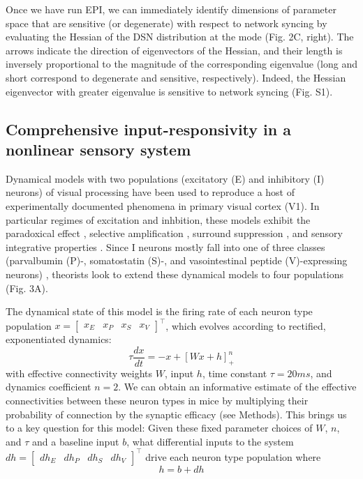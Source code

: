 \documentclass[11pt]{article}
\begin{document}
Once we have run EPI, we can immediately identify dimensions of parameter space that are sensitive (or degenerate) with respect to network syncing by evaluating the Hessian of the DSN distribution at the mode (Fig. 2C, right).  The arrows indicate the direction of eigenvectors of the Hessian, and their length is inversely proportional to the magnitude of the corresponding eigenvalue (long and short correspond to degenerate and sensitive, respectively).  Indeed, the Hessian eigenvector with greater eigenvalue is sensitive to network syncing (Fig. S1). 

\subsection{Comprehensive input-responsivity in a nonlinear sensory system}
Dynamical models with two populations (excitatory (E) and inhibitory (I) neurons) of visual processing have been used to reproduce a host of experimentally documented phenomena in primary visual cortex (V1).  In particular regimes of excitation and inhbition, these models exhibit the paradoxical effect \cite{tsodyks1997paradoxical}, selective amplification \cite{murphy2009balanced}, surround suppression \cite{ozeki2009inhibitory}, and  sensory integrative properties \cite{rubin2015stabilized}.  Since I neurons mostly fall into one of three classes (parvalbumin (P)-, somatostatin (S)-, and vasointestinal peptide (V)-expressing neurons) \cite{markram2004interneurons, rudy2011three}, theorists look to extend these dynamical models to four populations \cite{litwin2016inhibitory} (Fig. 3A).

The dynamical state of this model is the firing rate of each neuron type population $x = \begin{bmatrix} x_E & x_P & x_S & x_V \end{bmatrix}^\top$, which evolves according to rectified, exponentiated dynamics:
\begin{equation}
\tau \frac{dx}{dt} = -x + [W x+ h]_+^n
\end{equation}
with effective connectivity weights $W$, input $h$, time constant $\tau = 20ms$, and dynamics coefficient $n = 2$.  
We can obtain an informative estimate of the effective connectivities between these neuron types in mice by multiplying their probability of connection by the synaptic efficacy \cite{allen} (see Methods).
This brings us to a key question for this model: Given these fixed parameter choices of $W$, $n$, and $\tau$ and a baseline input $b$, what differential inputs to the system $dh = \begin{bmatrix} dh_E & dh_P & dh_S & dh_V \end{bmatrix}^\top$ drive each neuron type population where
\begin{equation}
h = b + dh
\end{equation}
\end{document}
